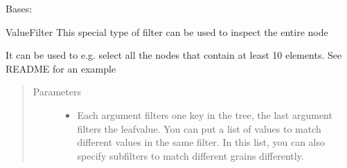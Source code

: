 \documentclass[a4paper,10pt,english]{sphinxmanual}
\begin{document}
\begin{fulllineitems}
\label{\detokenize{fagus:fagus.VFil}}
\pysigstartsignatures
{}
\pysigstopsignatures
\sphinxAtStartPar
Bases: {\hyperref[\detokenize{fagus.filters:fagus.filters.FilBase}]{}}

\sphinxAtStartPar
ValueFilter \sphinxhyphen{} This special type of filter can be used to inspect the entire node

\sphinxAtStartPar
It can be used to e.g. select all the nodes that contain at least 10 elements. See README for an example

\begin{fulllineitems}
\label{\detokenize{fagus:fagus.VFil.__init__}}
\pysigstartsignatures
{}
\pysigstopsignatures\begin{quote}\begin{description}
\item[{Parameters}] \leavevmode\begin{itemize}
\item {}
\sphinxAtStartPar
{} \textendash{} Each argument filters one key in the tree, the last argument filters the leaf\sphinxhyphen{}value. You can
put a list of values to match different values in the same filter. In this list, you can also specify
subfilters to match different grains differently.


\end{itemize}
\end{description}
\end{quote}
\end{fulllineitems}
\end{fulllineitems}
\end{document}
